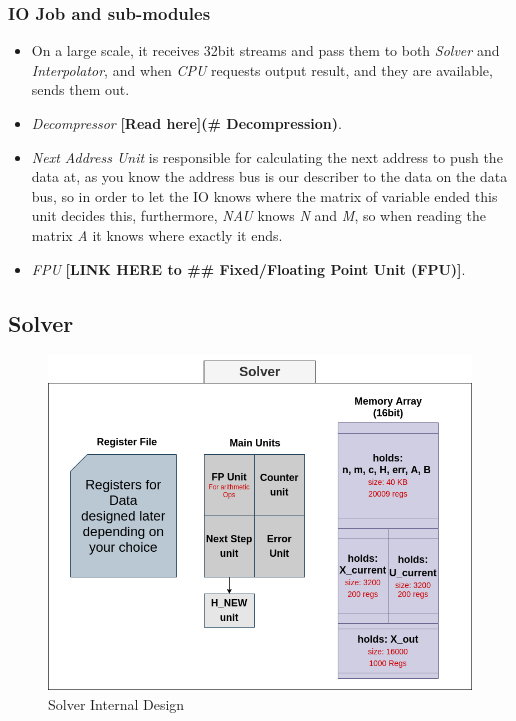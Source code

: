 \documentclass[12pt]{report}
\begin{document}
\subsubsection{IO Job and sub-modules}

\begin{itemize}
    \item On a large scale, it receives 32bit streams and pass them to both \emph{Solver} and \emph{Interpolator}, and when \emph{CPU} requests output result, and they are available, sends them out.
    \item \emph{Decompressor} \textbf{[Read here](\# Decompression)}. %
    \item \emph{Next Address Unit} is responsible for calculating the next address to push the data at, as you know the address bus is our describer to the data on the data bus, so in order to let the IO knows where the matrix of variable ended this unit decides this, furthermore, \emph{NAU} knows \emph{N} and \emph{M}, so when reading the matrix \emph{A} it knows where exactly it ends.
    \item \emph{FPU} \textbf{[LINK HERE to \#\# Fixed/Floating Point Unit (FPU)]}. %
\end{itemize}

\subsection{Solver}

\begin{figure}[hp]
    \centering
    \includegraphics[width=\textwidth]{solver}
    \caption{Solver Internal Design}
    \label{fig:solver}
\end{figure}
\end{document}
